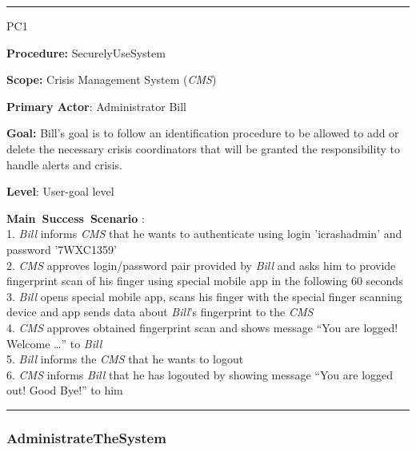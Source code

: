 \hrule
\begin{lyxlist}{PC1}
\small{
\item [\textbf{Procedure:}] SecurelyUseSystem
\item [\textbf{Scope:}] Crisis Management System (\emph{CMS})
\item [\textbf{Primary Actor}:] Administrator Bill
\item [\textbf{Goal:}] Bill’s goal is to follow an
identification procedure to be allowed to add or delete the necessary crisis
coordinators that will be granted the responsibility to handle alerts and crisis.
\item [\textbf{Level}:] User-goal level
\item [\textbf{Main~Success~Scenario}]:\\
1. \emph{Bill} informs \emph{CMS} that he wants to authenticate using login
'icrashadmin' and password '7WXC1359'\\
2. \emph{CMS} approves login/password pair provided by \emph{Bill} and asks
him to provide fingerprint scan of his finger using special mobile app in the
following 60 seconds\\
3. \emph{Bill} opens special mobile app, scans his finger with the special
finger scanning device and app sends data about \emph{Bill}'s fingerprint to
the \emph{CMS}\\
4. \emph{CMS} approves obtained fingerprint scan and shows message ``You are
logged! Welcome \ldots'' to \emph{Bill}\\
5. \emph{Bill} informs the \emph{CMS} that he wants to logout\\
6. \emph{CMS} informs \emph{Bill} that he has logouted by showing message ``You
are logged out! Good Bye!'' to him
}
\end{lyxlist}
\hrule

\subsubsection{AdministrateTheSystem}

